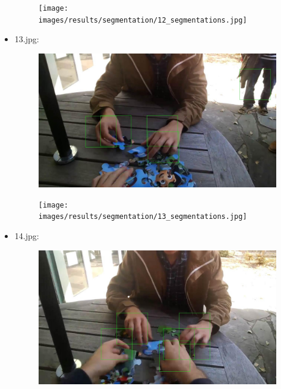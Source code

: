 \begin{itemize}
\begin{figure}[!htb]
\begin{minipage}{0.5\textwidth}
            \end{minipage}\hfill
            \begin{minipage}{0.5\textwidth}
                \centering
                \texttt{[image: images/results/segmentation/12\_segmentations.jpg]}
            \end{minipage}
        \end{figure}
    \item 13.jpg:
        \begin{figure}[!htb]
            \begin{minipage}{0.5\textwidth}
                \centering
                \includegraphics[scale = 0.205]{images/results/detection/13_detections.jpg}
            \end{minipage}\hfill
            \begin{minipage}{0.5\textwidth}
                \centering
                \texttt{[image: images/results/segmentation/13\_segmentations.jpg]}
            \end{minipage}
        \end{figure}
    \item 14.jpg:
        \begin{figure}[!htb]
            \begin{minipage}{0.5\textwidth}
                \centering
                \includegraphics[scale = 0.205]{images/results/detection/14_detections.jpg}

\end{minipage}
\end{figure}
\end{itemize}
